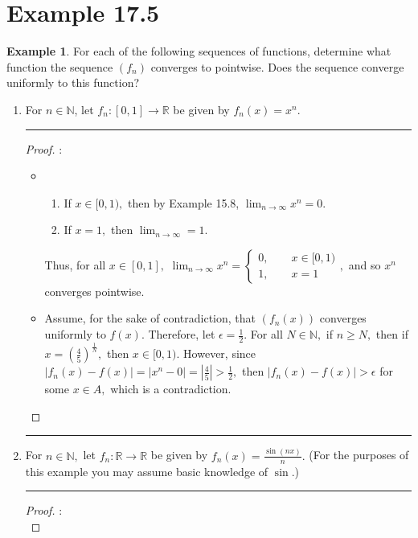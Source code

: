 \documentclass[openany, amssymb, psamsfonts]{amsart}
\newcommand{\bbN}{\mathbb{N}}
\newcommand{\bbR}{\mathbb{R}}
\theoremstyle{definition}
\newtheorem{exmp}{Example}[section]
\numberwithin{equation}{section}
\begin{document}
\section*{Example 17.5}
\begin{exmp} 
\label{17.5}
	For each of the following sequences of functions, determine what function the sequence $(f_n)$ converges to pointwise. Does the sequence converge uniformly to this function?
\end{exmp}
\begin{enumerate}
\item[i)]  For $n \in \bbN$, let $f_n\colon [0, 1] \to \bbR$ be given by $f_n(x) = x^n$.	
\vspace{4pt}     \hrule   \vspace{4pt}\begin{proof}:\\
\begin{itemize}
\item 
\begin{enumerate}
    \item If $x \in [0,1),$ then by Example 15.8, $\displaystyle\lim_{n\to \infty}x^n = 0.$
    \item If $x = 1,$ then $\displaystyle\lim_{n\to \infty} =1.$
\end{enumerate}
Thus, for all $x\in [0,1],$  $\displaystyle\lim_{n \to \infty}x^n = 
\begin{cases}
0,\qquad x\in [0,1)\\
1,\qquad x = 1
\end{cases},$ and so $x^n$ converges pointwise.
\item Assume, for the sake of contradiction, that $(f_n(x))$ converges uniformly to $f(x).$ Therefore, let $\epsilon = \frac{1}{2}.$ For all $N \in \bbN,$ if $n\geq N,$ then if $x = (\frac{4}{5})^\frac{1}{N},$ then $x\in [0,1).$ However, since $|f_n(x) - f(x)| = |x^n - 0| = |\frac{4}{5}|> \frac{1}{2},$ then $|f_n(x) - f(x)|>\epsilon$ for some $x\in A,$ which is a contradiction.
\end{itemize}
\end{proof}\vspace{4pt}     \hrule   \vspace{4pt}
\item[ii)] For $n\in \bbN,$ let $f_n\colon \bbR\to \bbR$ be given by $\displaystyle f_n(x)=\frac{\sin (nx)}{n}.$ (For the purposes of this example you may assume basic knowledge of $\sin$.)
\vspace{4pt}     \hrule   \vspace{4pt}\begin{proof}:\\

\end{proof}
\end{enumerate}
\end{document}
